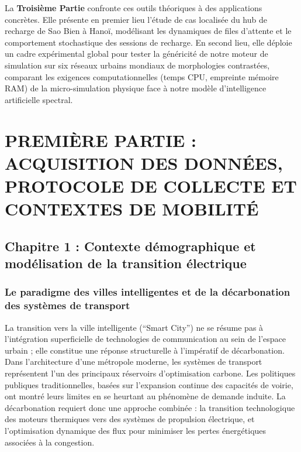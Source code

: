 \documentclass[11pt, a4paper]{article}
\begin{document}
La \textbf{Troisième Partie} confronte ces outils théoriques à des
applications concrètes. Elle présente en premier lieu l'étude de cas
localisée du hub de recharge de Sao Bien à Hanoï, modélisant les
dynamiques de files d'attente et le comportement stochastique des
sessions de recharge. En second lieu, elle déploie un cadre expérimental
global pour tester la généricité de notre moteur de simulation sur six
réseaux urbains mondiaux de morphologies contrastées, comparant les
exigences computationnelles (temps CPU, empreinte mémoire RAM) de la
micro-simulation physique face à notre modèle d'intelligence
artificielle spectral.

\newpage

\section{PREMIÈRE PARTIE : ACQUISITION DES DONNÉES, PROTOCOLE DE
COLLECTE ET CONTEXTES DE
MOBILITÉ}\label{premiuxe8re-partie-acquisition-des-donnuxe9es-protocole-de-collecte-et-contextes-de-mobilituxe9}

\subsection{Chapitre 1 : Contexte démographique et modélisation de la
transition
électrique}\label{chapitre-1-contexte-duxe9mographique-et-moduxe9lisation-de-la-transition-uxe9lectrique}

\subsubsection{Le paradigme des villes intelligentes et de la
décarbonation des systèmes de
transport}\label{le-paradigme-des-villes-intelligentes-et-de-la-duxe9carbonation-des-systuxe8mes-de-transport}

La transition vers la ville intelligente (``Smart City'') ne se résume
pas à l'intégration superficielle de technologies de communication au
sein de l'espace urbain ; elle constitue une réponse structurelle à
l'impératif de décarbonation. Dans l'architecture d'une métropole
moderne, les systèmes de transport représentent l'un des principaux
réservoirs d'optimisation carbone. Les politiques publiques
traditionnelles, basées sur l'expansion continue des capacités de
voirie, ont montré leurs limites en se heurtant au phénomène de demande
induite. La décarbonation requiert donc une approche combinée : la
transition technologique des moteurs thermiques vers des systèmes de
propulsion électrique, et l'optimisation dynamique des flux pour
minimiser les pertes énergétiques associées à la congestion.
\end{document}
